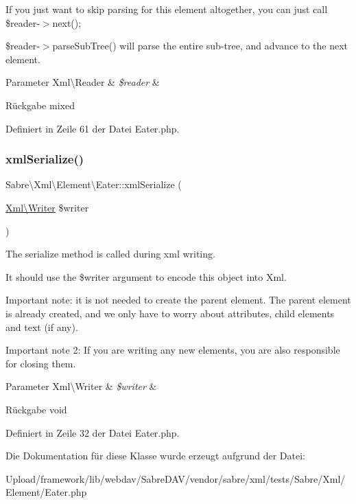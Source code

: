 If you just want to skip parsing for this element altogether, you can just call \$reader-\/$>$next();

\$reader-\/$>$parse\+Sub\+Tree() will parse the entire sub-\/tree, and advance to the next element.


\begin{DoxyParams}[1]{Parameter}
Xml\textbackslash{}\+Reader & {\em \$reader} & \\
\hline
\end{DoxyParams}
\begin{DoxyReturn}{Rückgabe}
mixed 
\end{DoxyReturn}


Definiert in Zeile 61 der Datei Eater.\+php.

\mbox{\label{class_sabre_1_1_xml_1_1_element_1_1_eater_adbcc612a068aafce570395bca752b42f}} 
\subsubsection{\texorpdfstring{xml\+Serialize()}{xmlSerialize()}}
{\footnotesize\ttfamily Sabre\textbackslash{}\+Xml\textbackslash{}\+Element\textbackslash{}\+Eater\+::xml\+Serialize (\begin{DoxyParamCaption}\item[{\mbox{\hyperlink{class_sabre_1_1_xml_1_1_writer}{Xml\textbackslash{}\+Writer}}}]{\$writer }\end{DoxyParamCaption})}

The serialize method is called during xml writing.

It should use the \$writer argument to encode this object into Xml.

Important note\+: it is not needed to create the parent element. The parent element is already created, and we only have to worry about attributes, child elements and text (if any).

Important note 2\+: If you are writing any new elements, you are also responsible for closing them.


\begin{DoxyParams}[1]{Parameter}
Xml\textbackslash{}\+Writer & {\em \$writer} & \\
\hline
\end{DoxyParams}
\begin{DoxyReturn}{Rückgabe}
void 
\end{DoxyReturn}


Definiert in Zeile 32 der Datei Eater.\+php.



Die Dokumentation für diese Klasse wurde erzeugt aufgrund der Datei\+:\begin{DoxyCompactItemize}
\item 
Upload/framework/lib/webdav/\+Sabre\+D\+A\+V/vendor/sabre/xml/tests/\+Sabre/\+Xml/\+Element/Eater.\+php\end{DoxyCompactItemize}
